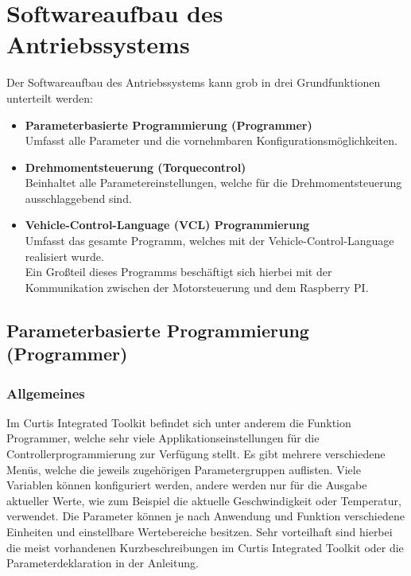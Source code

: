 \section{Softwareaufbau des Antriebssystems}
Der Softwareaufbau des Antriebssystems kann grob in drei Grundfunktionen unterteilt werden:
\\[5mm]
\begin{itemize}
	\item \textbf{Parameterbasierte Programmierung (Programmer)}
	\\[1mm] Umfasst alle Parameter und die vornehmbaren Konfigurationsmöglichkeiten.
	\medskip
	\item \textbf{Drehmomentsteuerung (Torquecontrol)}
	\\[1mm] Beinhaltet alle Parametereinstellungen, welche für die Drehmomentsteuerung ausschlaggebend sind.
	\medskip
	\item \textbf{Vehicle-Control-Language (VCL) Programmierung}
	\\[1mm] Umfasst das gesamte Programm, welches mit der Vehicle-Control-Language realisiert wurde.
	\\ Ein Großteil dieses Programms beschäftigt sich hierbei mit der Kommunikation zwischen der Motorsteuerung und dem Raspberry PI.
\end{itemize}

\newpage

\subsection{Parameterbasierte Programmierung (Programmer)}
\subsubsection{Allgemeines}
Im Curtis Integrated Toolkit befindet sich unter anderem die Funktion \glqq Programmer\grqq{}, welche sehr viele Applikationseinstellungen für die Controllerprogrammierung zur Verfügung stellt. Es gibt mehrere verschiedene Menüs, welche die jeweils zugehörigen Parametergruppen auflisten. Viele Variablen können konfiguriert werden, andere werden nur für die Ausgabe aktueller Werte, wie zum Beispiel die aktuelle Geschwindigkeit oder Temperatur, verwendet. Die Parameter können je nach Anwendung und Funktion verschiedene Einheiten und einstellbare Wertebereiche besitzen. Sehr vorteilhaft sind hierbei die meist vorhandenen Kurzbeschreibungen im Curtis Integrated Toolkit oder die Parameterdeklaration in der Anleitung.
\\[5mm]

